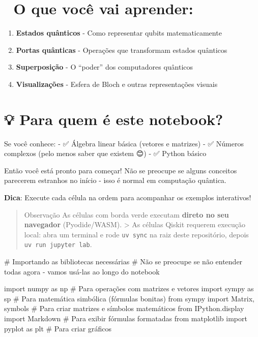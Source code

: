 \documentclass[
  brazilian,
]{report}
\newenvironment{Shaded}{\begin{snugshade}}{\end{snugshade}}
\newcommand{\NormalTok}[1]{\textcolor[rgb]{0.00,0.23,0.31}{#1}}
\providecommand{\tightlist}{%
  \setlength{\itemsep}{0pt}\setlength{\parskip}{0pt}}
\begin{document}
\section{🎯 O que você vai aprender:}\label{o-que-vocuxea-vai-aprender}

\begin{enumerate}
\def\labelenumi{\arabic{enumi}.}
\tightlist
\item
  \textbf{Estados quânticos} - Como representar qubits matematicamente
\item
  \textbf{Portas quânticas} - Operações que transformam estados
  quânticos
\item
  \textbf{Superposição} - O ``poder'' dos computadores quânticos
\item
  \textbf{Visualizações} - Esfera de Bloch e outras representações
  visuais
\end{enumerate}

\section{💡 Para quem é este
notebook?}\label{para-quem-uxe9-este-notebook}

Se você conhece: - ✅ Álgebra linear básica (vetores e matrizes) - ✅
Números complexos (pelo menos saber que existem 😊) - ✅ Python básico

Então você está pronto para começar! Não se preocupe se alguns conceitos
parecerem estranhos no início - isso é normal em computação quântica.

\textbf{Dica}: Execute cada célula na ordem para acompanhar os exemplos
interativos!

\begin{quote}
Observação As células com borda verde executam \textbf{direto no seu
navegador} (Pyodide/WASM). \textgreater{} As células Qiskit requerem
execução local: abra um terminal e rode \texttt{uv\ sync} na raiz deste
repositório, depois \texttt{uv\ run\ jupyter\ lab}.
\end{quote}

\begin{Shaded}
\begin{Highlighting}[]
\NormalTok{\# Importando as bibliotecas necessárias}
\NormalTok{\# Não se preocupe se não entender todas agora {-} vamos usá{-}las ao longo do notebook}

\NormalTok{import numpy as np                      \# Para operações com matrizes e vetores}
\NormalTok{import sympy as sp                      \# Para matemática simbólica (fórmulas bonitas)}
\NormalTok{from sympy import Matrix, symbols       \# Para criar matrizes e símbolos matemáticos}
\NormalTok{from IPython.display import Markdown    \# Para exibir fórmulas formatadas}
\NormalTok{from matplotlib import pyplot as plt    \# Para criar gráficos}
\end{Highlighting}
\end{Shaded}
\end{document}
